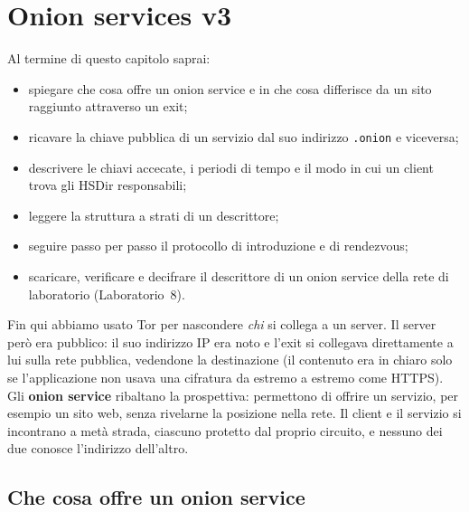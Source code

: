 \chapter{Onion services v3}\label{cap:14-onion-services}

\begin{obiettivi}
Al termine di questo capitolo saprai:
\begin{itemize}[nosep]
  \item spiegare che cosa offre un onion service e in che cosa differisce da un sito raggiunto attraverso un exit;
  \item ricavare la chiave pubblica di un servizio dal suo indirizzo \texttt{.onion} e viceversa;
  \item descrivere le chiavi accecate, i periodi di tempo e il modo in cui un client trova gli HSDir responsabili;
  \item leggere la struttura a strati di un descrittore;
  \item seguire passo per passo il protocollo di introduzione e di rendezvous;
  \item scaricare, verificare e decifrare il descrittore di un onion service della rete di laboratorio (Laboratorio~8).
\end{itemize}
\end{obiettivi}

Fin qui abbiamo usato Tor per nascondere \emph{chi} si collega a un server. Il server però era pubblico: il suo indirizzo IP era noto e l'exit si collegava direttamente a lui sulla rete pubblica, vedendone la destinazione (il contenuto era in chiaro solo se l'applicazione non usava una cifratura da estremo a estremo come HTTPS). Gli \textbf{onion service} ribaltano la prospettiva: permettono di offrire un servizio, per esempio un sito web, senza rivelarne la posizione nella rete. Il client e il servizio si incontrano a metà strada, ciascuno protetto dal proprio circuito, e nessuno dei due conosce l'indirizzo dell'altro.

\section{Che cosa offre un onion service}\label{sec:os-proprieta}

